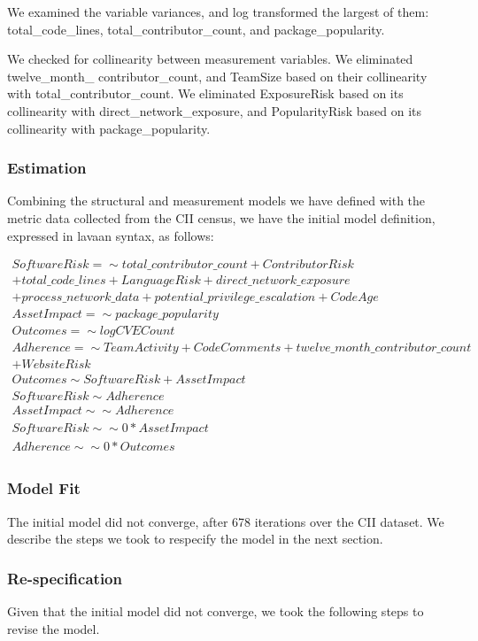 We examined the variable variances, and log transformed the largest of them: total\_code\_lines, total\_contributor\_count, and package\_popularity.

We checked for collinearity between measurement variables. We eliminated twelve\_month\_ contributor\_count, and TeamSize based on their collinearity with total\_contributor\_count. We eliminated ExposureRisk based on its collinearity with direct\_network\_exposure, and PopularityRisk based on its collinearity with package\_popularity.

\subsubsection{Estimation}
Combining the structural and measurement models we have defined with the metric data collected from the CII census, we have the initial model definition, expressed in lavaan syntax, as follows:

\begin{align*}
SoftwareRisk =\sim  total\_contributor\_count + ContributorRisk \\ + total\_code\_lines 
+ LanguageRisk + direct\_network\_exposure\\
 + process\_network\_data 
+ potential\_privilege\_escalation + CodeAge \\
AssetImpact =\sim package\_popularity \\
Outcomes =\sim  logCVECount \\
Adherence =\sim  TeamActivity + CodeComments + 
	twelve\_month\_contributor\_count\\  + WebsiteRisk  \\
Outcomes \sim SoftwareRisk + AssetImpact \\
SoftwareRisk \sim  Adherence \\
AssetImpact \sim\sim  Adherence\\
SoftwareRisk \sim\sim 0*AssetImpact\\
Adherence \sim\sim 0*Outcomes\\
\end{align*}

\subsubsection{Model Fit}
The initial model did not converge, after 678 iterations over the CII dataset. We describe the steps we took to respecify the model in the next section.
 
\subsubsection{Re-specification}
Given that the initial model did not converge, we took the following steps to revise the model.


